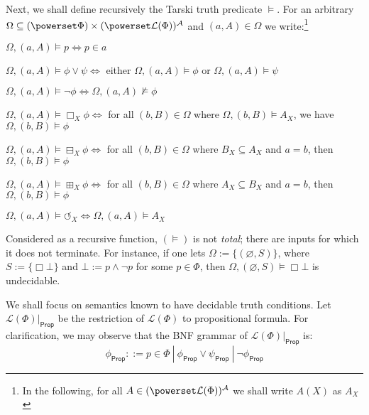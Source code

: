 \documentclass[11pt]{article}
\newcommand{\Nec}{\Box}
\newcommand{\BB}{\boxminus}
\newcommand{\BBI}{\boxplus}
\begin{document}
Next, we shall define recursively the Tarski truth predicate $\models$.  For an arbitrary $\Omega \subseteq (\powerset \Phi) \times (\powerset \mathcal{L}(\Phi))^\mathcal{A}$ and $(a,A) \in \Omega$ we write:\footnote{In the following, for all $A \in (\powerset \mathcal{L}(\Phi))^\mathcal{A}$ we shall write $A(X)$ as $A_X$}
\begin{peano}
	\item $\Omega, (a,A) \models p \iff p \in a$
	\item $\Omega, (a,A) \models \phi \vee \psi \iff$ either $\Omega, (a,A) \models \phi$ or $\Omega, (a,A) \models \psi$
	\item $\Omega, (a,A) \models \neg \phi  \iff \Omega, (a,A) \not\models \phi$
	\item $\Omega, (a,A) \models \Box_X \phi  \iff $ for all $(b,B) \in \Omega$ where $\Omega, (b,B) \models A_X$, we have $\Omega, (b,B) \models \phi$
	\item $\Omega, (a,A) \models \BB_X \phi  \iff $ for all $(b,B) \in \Omega$ where $B_X \subseteq A_X$ and $a = b$, then $\Omega, (b,B) \models \phi$
	\item $\Omega, (a,A) \models \BBI_X \phi  \iff $ for all $(b,B) \in \Omega$ where $A_X \subseteq B_X$ and $a = b$, then $\Omega, (b,B) \models \phi$
	\item $\Omega, (a,A) \models \circlearrowleft_X  \iff \Omega, (a,A) \models A_X$ 
\end{peano}

 Considered as a recursive function, $(\models)$ is not \emph{total}; there are inputs for which it does not terminate.  For instance, if one lets $\Omega := \{(\varnothing,S)\}$, where $S := \{ \Nec \bot \}$ and $\bot := p \wedge \neg p$ for some $p \in \Phi$, then $\Omega, (\varnothing,S) \models \Nec \bot$ is undecidable.

We shall focus on semantics known to have decidable truth conditions.  Let $\mathcal{L}(\Phi)|_{\mathsf{Prop}}$ be the restriction of $\mathcal{L}(\Phi)$ to propositional formula.  For clarification, we may observe that the BNF grammar of $\mathcal{L}(\Phi)|_{\mathsf{Prop}}$ is:
$$\phi_{\mathsf{Prop}} ::= p \in \Phi \ |\ \phi_{\mathsf{Prop}} \vee \psi_{\mathsf{Prop}} \ | \ \neg \phi_{\mathsf{Prop}}$$
\end{document}
